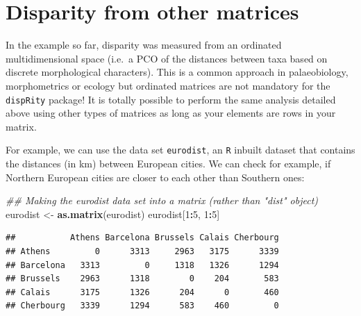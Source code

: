 \documentclass[]{book}
\newenvironment{Shaded}{\begin{snugshade}}{\end{snugshade}}
\newcommand{\CommentTok}[1]{\textcolor[rgb]{0.56,0.35,0.01}{\textit{#1}}}
\newcommand{\DecValTok}[1]{\textcolor[rgb]{0.00,0.00,0.81}{#1}}
\newcommand{\KeywordTok}[1]{\textcolor[rgb]{0.13,0.29,0.53}{\textbf{#1}}}
\newcommand{\NormalTok}[1]{#1}
\newcommand{\OperatorTok}[1]{\textcolor[rgb]{0.81,0.36,0.00}{\textbf{#1}}}
\newcommand{\StringTok}[1]{\textcolor[rgb]{0.31,0.60,0.02}{#1}}
\begin{document}
\hypertarget{other-matrices}{%
\section{Disparity from other matrices}\label{other-matrices}}

In the example so far, disparity was measured from an ordinated multidimensional space (i.e.~a PCO of the distances between taxa based on discrete morphological characters).
This is a common approach in palaeobiology, morphometrics or ecology but ordinated matrices are not mandatory for the \texttt{dispRity} package!
It is totally possible to perform the same analysis detailed above using other types of matrices as long as your elements are rows in your matrix.

For example, we can use the data set \texttt{eurodist}, an \texttt{R} inbuilt dataset that contains the distances (in km) between European cities.
We can check for example, if Northern European cities are closer to each other than Southern ones:

\begin{Shaded}
\begin{Highlighting}[]
\CommentTok{## Making the eurodist data set into a matrix (rather than "dist" object)}
\NormalTok{eurodist <-}\StringTok{ }\KeywordTok{as.matrix}\NormalTok{(eurodist)}
\NormalTok{eurodist[}\DecValTok{1}\OperatorTok{:}\DecValTok{5}\NormalTok{, }\DecValTok{1}\OperatorTok{:}\DecValTok{5}\NormalTok{]}
\end{Highlighting}
\end{Shaded}

\begin{verbatim}
##           Athens Barcelona Brussels Calais Cherbourg
## Athens         0      3313     2963   3175      3339
## Barcelona   3313         0     1318   1326      1294
## Brussels    2963      1318        0    204       583
## Calais      3175      1326      204      0       460
## Cherbourg   3339      1294      583    460         0
\end{verbatim}
\end{document}
